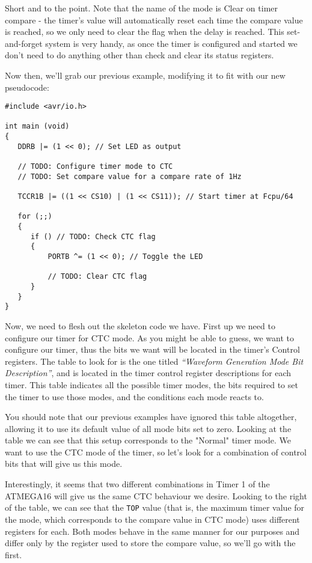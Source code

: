 \documentclass[a4paper,oneside,notitlepage]{book}
\begin{document}
Short and to the point. Note that the name of the mode is Clear on timer compare - the timer's value will automatically reset each time the compare value is reached, so we only need to clear the flag when the delay is reached. This set-and-forget system is very handy, as once the timer is configured and started we don't need to do anything other than check and clear its status registers.

Now then, we'll grab our previous example, modifying it to fit with our new pseudocode: 

\begin{center}
\begin{lstlisting}
#include <avr/io.h>

int main (void)
{
   DDRB |= (1 << 0); // Set LED as output

   // TODO: Configure timer mode to CTC
   // TODO: Set compare value for a compare rate of 1Hz

   TCCR1B |= ((1 << CS10) | (1 << CS11)); // Start timer at Fcpu/64

   for (;;)
   {
      if () // TODO: Check CTC flag
      {
          PORTB ^= (1 << 0); // Toggle the LED

          // TODO: Clear CTC flag
      }
   }
}
\end{lstlisting}
\end{center}

Now, we need to flesh out the skeleton code we have. First up we need to configure our timer for CTC mode. As you might be able to guess, we want to configure our timer, thus the bits we want will be located in the timer's Control registers. The table to look for is the one titled \emph{``Waveform Generation Mode Bit Description''}, and is located in the timer control register descriptions for each timer. This table indicates all the possible timer modes, the bits required to set the timer to use those modes, and the conditions each mode reacts to.

You should note that our previous examples have ignored this table altogether, allowing it to use its default value of all mode bits set to zero. Looking at the table we can see that this setup corresponds to the "Normal" timer mode. We want to use the CTC mode of the timer, so let's look for a combination of control bits that will give us this mode.

Interestingly, it seems that two different combinations in Timer 1 of the ATMEGA16 will give us the same CTC behaviour we desire. Looking to the right of the table, we can see that the \texttt{TOP} value (that is, the maximum timer value for the mode, which corresponds to the compare value in CTC mode) uses different registers for each. Both modes behave in the same manner for our purposes and differ only by the register used to store the compare value, so we'll go with the first.
\end{document}
